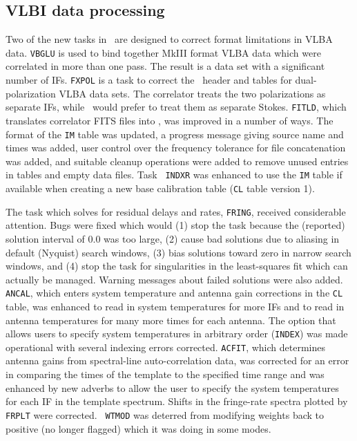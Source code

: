 \subsection{VLBI data processing}

Two of the new tasks in \RELEASENAME\ are designed to correct format
limitations in VLBA data.  {\tt VBGLU} is used to bind together MkIII
format VLBA data which were correlated in more than one pass.  The
result is a data set with a significant number of IFs.  {\tt FXPOL} is
a task to correct the \AIPS\ header and tables for dual-polarization
VLBA data sets.  The correlator treats the two polarizations as
separate IFs, while \AIPS\ would prefer to treat them as separate
Stokes.  {\tt FITLD}, which translates correlator FITS files into
\AIPS, was improved in a number of ways.  The format of the {\tt IM}
table was updated, a progress message giving source name and times was
added, user control over the frequency tolerance for file
concatenation was added, and suitable cleanup operations were added to
remove unused entries in tables and empty data files.  Task {\tt
INDXR} was enhanced to use the {\tt IM} table if available when
creating a new base calibration table ({\tt CL} table version 1).

The task which solves for residual delays and rates, {\tt FRING},
received considerable attention.  Bugs were fixed which would (1) stop
the task because the (reported) solution interval of 0.0 was too
large, (2) cause bad solutions due to aliasing in default (Nyquist)
search windows, (3) bias solutions toward zero in narrow search
windows, and (4) stop the task for singularities in the least-squares
fit which can actually be managed.  Warning messages about failed
solutions were also added.  {\tt ANCAL}, which enters system
temperature and antenna gain corrections in the {\tt CL} table, was
enhanced to read in system temperatures for more IFs and to read in
antenna temperatures for many more times for each antenna.  The option
that allows users to specify system temperatures in arbitrary order
({\tt INDEX}) was made operational with several indexing errors
corrected.  {\tt ACFIT}, which determines antenna gains from
spectral-line auto-correlation data, was corrected for an error in
comparing the times of the template to the specified time range and
was enhanced by new adverbs to allow the user to specify the system
temperatures for each IF in the template spectrum.  Shifts in the
fringe-rate spectra plotted by {\tt FRPLT} were corrected.  {\tt
WTMOD} was deterred from modifying weights back to positive (no longer
flagged) which it was doing in some modes.

